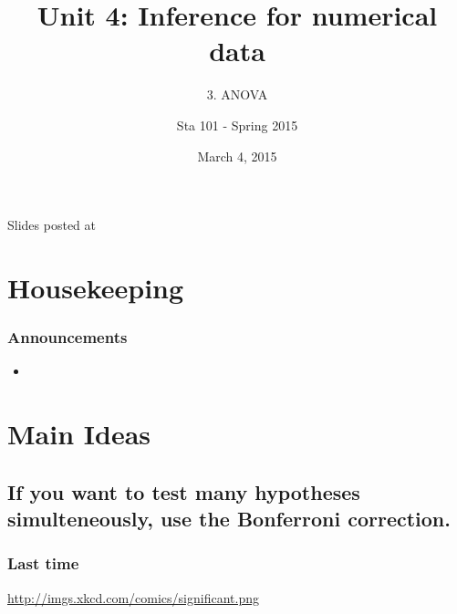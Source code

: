 \documentclass[slidestop,compress,mathserif,12pt,t,professionalfonts,xcolor=table]{beamer}
\title{Unit 4: Inference for numerical data}
\subtitle{3. ANOVA}
\author{Sta 101 - Spring 2015}
\date{March 4, 2015}
\institute{Duke University, Department of Statistical Science}
\newcommand{\bonferroni}{If you want to test many hypotheses simulteneously, use
  the Bonferroni correction.}
\begin{document}


\begin{frame}[plain]

\titlepage
\vfill
{\scriptsize {} \hfill Slides posted at  \webLink{\CourseSite}{\CourseSite}}
\addtocounter{framenumber}{-1} 

\end{frame}


\section{Housekeeping}


\begin{frame}
\frametitle{Announcements}

\begin{itemize}

\item 

\end{itemize}

\end{frame}


\section{Main Ideas}


\subsection{\bonferroni}
\label{mi1}


\begin{frame}
  \frametitle{Last time}

  \vfill

  \url{http://imgs.xkcd.com/comics/significant.png}

  \vfill

\end{frame}

\end{document}
